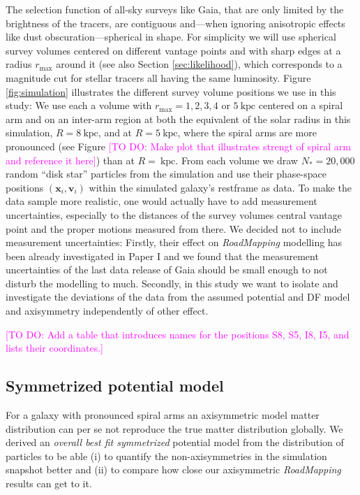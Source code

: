 \documentclass[iop,revtex4,numberedappendix,appendixfloats]{emulateapj}
\newcommand{\vect}[1]{\boldsymbol{#1}}
\newcommand{\RM}{{\sl RoadMapping}}
\newcommand{\Wilma}[1]{\textcolor{Magenta}{#1}}
\begin{document}
The selection function of all-sky surveys like Gaia, that are only limited by the brightness of the tracers, are contiguous and---when ignoring anisotropic effects like dust obscuration---spherical in shape. For simplicity we will use spherical survey volumes centered on different vantage points and with sharp edges at a radius $r_\text{max}$ around it (see also Section \ref{sec:likelihood}), which corresponds to a magnitude cut for stellar tracers all having the same luminosity. Figure \ref{fig:simulation} illustrates the different survey volume positions we use in this study: We use each a volume with $r_\text{max}=1,2,3,4$ or $5~\text{kpc}$ centered on a spiral arm and on an inter-arm region at both the equivalent of the solar radius in this simulation, $R=8~\text{kpc}$, and at $R=5~\text{kpc}$, where the spiral arms are more pronounced (see Figure \Wilma{[TO DO: Make plot that illustrates strengt of spiral arm and reference it here]}) than at $R=~\text{kpc}$. From each volume we draw $N_*=20,000$ random ``disk star'' particles from the simulation and use their phase-space positions $(\vect{x}_i,\vect{v}_i)$ within the simulated galaxy's restframe as data. To make the data sample more realistic, one would actually have to add measurement uncertainties, especially to the distances of the survey volumes central vantage point and the proper motions measured from there. We decided not to include measurement uncertainties: Firstly, their effect on \RM{} modelling has been already investigated in Paper I and we found that the measurement uncertainties of the last data release of Gaia should be small enough to not disturb the modelling to much. Secondly, in this study we want to isolate and investigate the deviations of the data from the assumed potential and DF model and axisymmetry independently of other effect.

\Wilma{[TO DO: Add a table that introduces names for the positions S8, S5, I8, I5, and lists their coordinates.]}

\subsection{Symmetrized potential model} \label{sec:DEHH-Pot}

For a galaxy with pronounced spiral arms an axisymmetric model matter distribution can per se not reproduce the true matter distribution globally. We derived an \emph{overall best fit symmetrized} potential model from the distribution of particles to be able (i) to quantify the non-axisymmetries in the simulation snapshot better and (ii) to compare how close our axisymmetric \RM{} results can get to it. 
\end{document}
